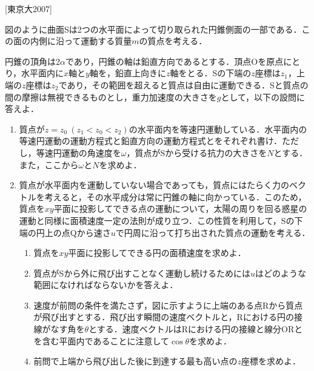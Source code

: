 


\noindent
{} [東京大2007]

図のように曲面Sは2つの水平面によって切り取られた円錐側面の一部である．この面の内側に沿って運動する質量$m$の質点を考える．

円錐の頂角は$2 \alpha$であり，円錐の軸は鉛直方向であるとする．頂点Oを原点にとり，水平面内に$x$軸と$y$軸を，鉛直上向きに$z$軸をとる．Sの下端の$z$座標は$z_1$，上端の$z$座標は$z_2$であり，その範囲を超えると質点は自由に運動できる．Sと質点の間の摩擦は無視できるものとし，重力加速度の大きさを$g$として，以下の設問に答えよ．

\begin{enumerate}[label={\textbf{問\arabic*}}]
  \item {\hzw} 質点が$z = z_0\ (z_1 < z_0 < z_2)$の水平面内を等速円運動している．水平面内の等速円運動の運動方程式と鉛直方向の運動方程式とをそれぞれ書け．ただし，等速円運動の角速度を$\omega$，質点がSから受ける抗力の大きさを$N$とする．また，ここから$\omega$と$N$を求めよ．
  \item {\hzw}質点が水平面内を運動していない場合であっても，質点にはたらく力のベクトルを考えると，その水平成分は常に円錐の軸に向かっている．このため，質点を$xy$平面に投影してできる点の運動について，太陽の周りを回る惑星の運動と同様に面積速度一定の法則が成り立つ．この性質を利用して，Sの下端の円上の点Qから速さ$u$で円周に沿って打ち出された質点の運動を考える．
  \begin{enumerate}[(1)]
    \item {\hzw}質点を$xy$平面に投影してできる円の面積速度を求めよ．
    \item {\hzw}質点がSから外に飛び出すことなく運動し続けるためには$u$はどのような範囲になければならないかを答えよ．
    \item {\hzw}速度が前問の条件を満たさず，図に示すように上端のある点Rから質点が飛び出すとする．飛び出す瞬間の速度ベクトルと，Rにおける円の接線がなす角を$\theta$とする．速度ベクトルはRにおける円の接線と線分ORとを含む平面内であることに注意して$\cos\theta$を求めよ．
    \item {\hzw}前問で上端から飛び出した後に到達する最も高い点の$z$座標を求めよ．
  \end{enumerate}
\end{enumerate}
